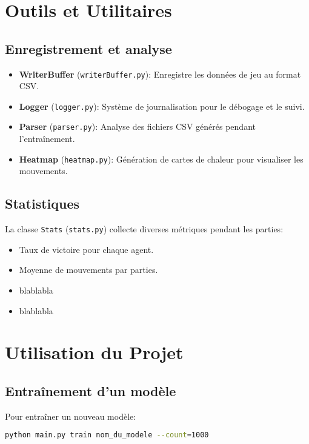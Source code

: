 \documentclass[]{article}
\begin{document}
\section{Outils et Utilitaires}

\subsection{Enregistrement et analyse}
\begin{itemize}
  \item \textbf{WriterBuffer} (\texttt{writerBuffer.py}): Enregistre les données de jeu au format CSV.
  \item \textbf{Logger} (\texttt{logger.py}): Système de journalisation pour le débogage et le suivi.
  \item \textbf{Parser} (\texttt{parser.py}): Analyse des fichiers CSV générés pendant l'entraînement.
  \item \textbf{Heatmap} (\texttt{heatmap.py}): Génération de cartes de chaleur pour visualiser les mouvements.
\end{itemize}

\subsection{Statistiques}
La classe \texttt{Stats} (\texttt{stats.py}) collecte diverses métriques pendant les parties:
\begin{itemize} %
  \item Taux de victoire pour chaque agent.
  \item Moyenne de mouvements par parties.
  \item blablabla
  \item blablabla
\end{itemize}

\section{Utilisation du Projet}

\subsection{Entraînement d'un modèle}
Pour entraîner un nouveau modèle:

\begin{lstlisting}[language=bash]
python main.py train nom_du_modele --count=1000
\end{lstlisting}
\end{document}

